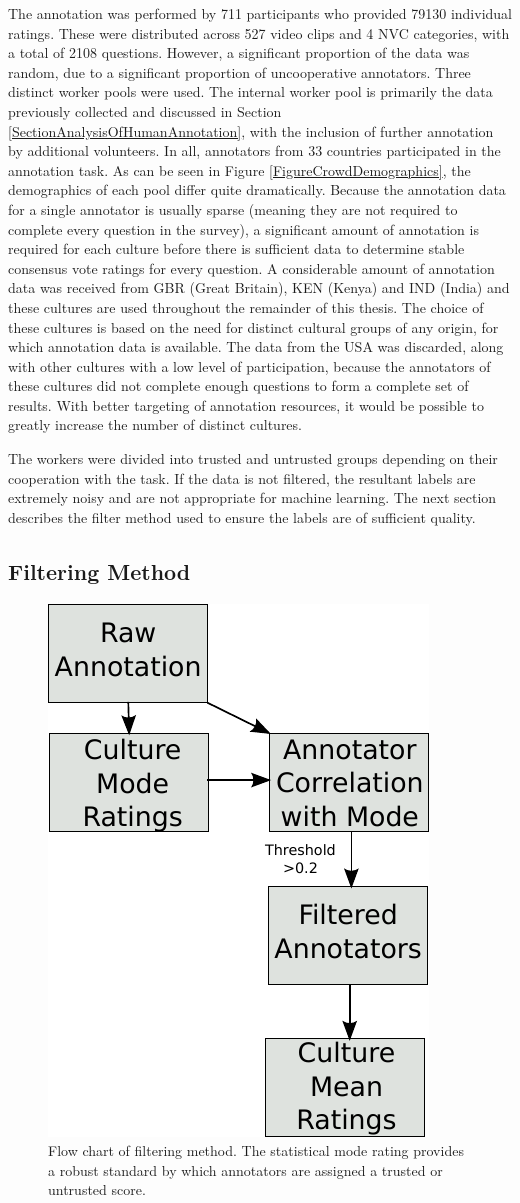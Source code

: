 The annotation was performed by 711 participants who provided 79130 individual ratings. These were distributed across 527 video clips and 4 \ac{NVC} categories, with a total of 2108 questions. However, a significant proportion of the data was random, due to a significant proportion of uncooperative annotators. Three distinct worker pools were used. The internal worker pool is primarily the data previously collected and discussed in Section \ref{SectionAnalysisOfHumanAnnotation}, with the inclusion of further annotation by additional volunteers. In all, annotators from 33 countries participated in the annotation task. As can be seen in Figure \ref{FigureCrowdDemographics}, the demographics of each pool differ quite dramatically. Because the annotation data for a single annotator is usually sparse (meaning they are not required to complete every question in the survey), a significant amount of annotation is required for each culture before there is sufficient data to determine stable consensus vote ratings for every question. A considerable amount of annotation data was received from GBR (Great Britain), KEN (Kenya) and IND (India) and these cultures are used throughout the remainder of this thesis. The choice of these cultures is based on the need for distinct cultural groups of any origin, for which annotation data is available. The data from the USA was discarded, along with other cultures with a low level of participation, because the annotators of these cultures did not complete enough questions to form a complete set of results. With better targeting of annotation resources, it would be possible to greatly increase the number of distinct cultures.

The workers were divided into trusted and untrusted groups depending on their cooperation with the task. If the data is not filtered, the resultant labels are extremely noisy and are not appropriate for machine learning. The next section describes the filter method used to ensure the labels are of sufficient quality.

\subsection{Filtering Method}
\label{SectionAnnotationFilterMethod}

\begin{figure}
\centering
\includegraphics[width = 0.3 \columnwidth]{annotation/FlowAnnotationFiltering.pdf}
\caption[Flow chart of filtering method.]{Flow chart of filtering method. The statistical mode rating provides a robust standard by which annotators are assigned a trusted or untrusted score.}
\label{FigureFilterFlowChart}
\end{figure}

